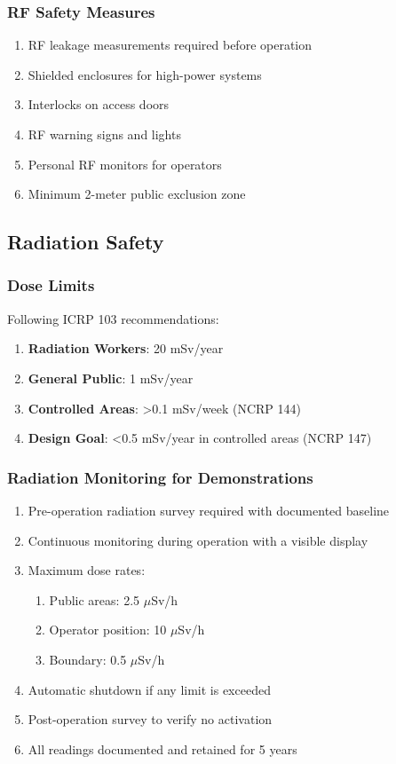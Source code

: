 \subsubsection{RF Safety Measures}
\begin{enumerate}[noitemsep]
    \item RF leakage measurements required before operation
    \item Shielded enclosures for high-power systems
    \item Interlocks on access doors
    \item RF warning signs and lights
    \item Personal RF monitors for operators
    \item Minimum 2-meter public exclusion zone
\end{enumerate}

\subsection{Radiation Safety}

\subsubsection{Dose Limits}
Following ICRP 103 recommendations:
\begin{enumerate}[noitemsep]
    \item \textbf{Radiation Workers}: 20 mSv/year
    \item \textbf{General Public}: 1 mSv/year
    \item \textbf{Controlled Areas}: >0.1 mSv/week (NCRP 144)
    \item \textbf{Design Goal}: <0.5 mSv/year in controlled areas (NCRP 147)
\end{enumerate}

\subsubsection{Radiation Monitoring for Demonstrations}
\begin{enumerate}
    \item Pre-operation radiation survey required with documented baseline
    \item Continuous monitoring during operation with a visible display
    \item Maximum dose rates:
    \begin{enumerate}
        \item Public areas: 2.5 $\mu$Sv/h
        \item Operator position: 10 $\mu$Sv/h
        \item Boundary: 0.5 $\mu$Sv/h
    \end{enumerate}
    \item Automatic shutdown if any limit is exceeded
    \item Post-operation survey to verify no activation
    \item All readings documented and retained for 5 years
\end{enumerate}

